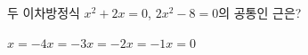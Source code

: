 두 이차방정식 $x^2+2x=0$, $2x^2-8=0$의 공통인 근은?
\begin{choices32}{$x=-4$}{$x=-3$}{$x=-2$}{$x=-1$}{$x=0$}\end{choices32}
